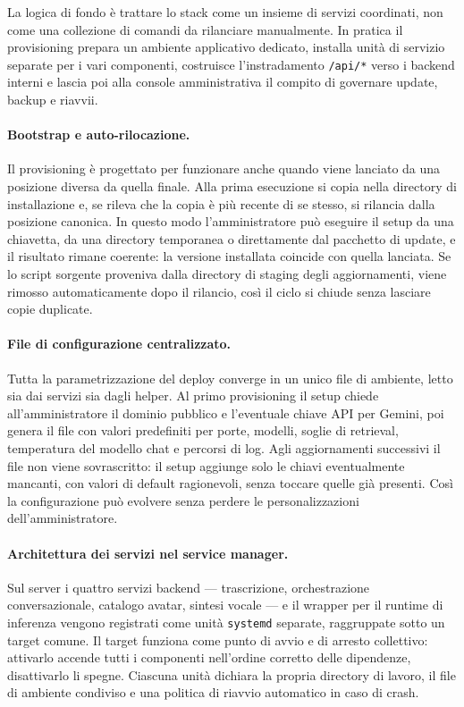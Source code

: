 La logica di fondo è trattare lo stack come un insieme di servizi coordinati, non come una collezione di comandi da rilanciare manualmente. In pratica il provisioning prepara un ambiente applicativo dedicato, installa unità di servizio separate per i vari componenti, costruisce l'instradamento \texttt{/api/*} verso i backend interni e lascia poi alla console amministrativa il compito di governare update, backup e riavvii.

\paragraph{Bootstrap e auto-rilocazione.}
Il provisioning è progettato per funzionare anche quando viene lanciato da una posizione diversa da quella finale. Alla prima esecuzione si copia nella directory di installazione e, se rileva che la copia è più recente di se stesso, si rilancia dalla posizione canonica. In questo modo l'amministratore può eseguire il setup da una chiavetta, da una directory temporanea o direttamente dal pacchetto di update, e il risultato rimane coerente: la versione installata coincide con quella lanciata. Se lo script sorgente proveniva dalla directory di staging degli aggiornamenti, viene rimosso automaticamente dopo il rilancio, così il ciclo si chiude senza lasciare copie duplicate.

\paragraph{File di configurazione centralizzato.}
Tutta la parametrizzazione del deploy converge in un unico file di ambiente, letto sia dai servizi sia dagli helper. Al primo provisioning il setup chiede all'amministratore il dominio pubblico e l'eventuale chiave API per Gemini, poi genera il file con valori predefiniti per porte, modelli, soglie di retrieval, temperatura del modello chat e percorsi di log. Agli aggiornamenti successivi il file non viene sovrascritto: il setup aggiunge solo le chiavi eventualmente mancanti, con valori di default ragionevoli, senza toccare quelle già presenti. Così la configurazione può evolvere senza perdere le personalizzazioni dell'amministratore.

\paragraph{Architettura dei servizi nel service manager.}
Sul server i quattro servizi backend --- trascrizione, orchestrazione conversazionale, catalogo avatar, sintesi vocale --- e il wrapper per il runtime di inferenza vengono registrati come unità \texttt{systemd} separate, raggruppate sotto un target comune. Il target funziona come punto di avvio e di arresto collettivo: attivarlo accende tutti i componenti nell'ordine corretto delle dipendenze, disattivarlo li spegne. Ciascuna unità dichiara la propria directory di lavoro, il file di ambiente condiviso e una politica di riavvio automatico in caso di crash.

